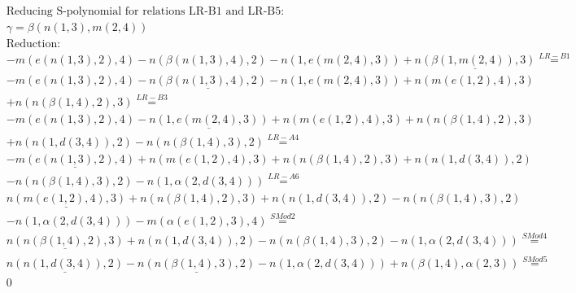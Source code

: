 \documentclass[11pt]{amsart}
\begin{document}
\begin{align*} 
& \text{Reducing S-polynomial for relations LR-B1 and LR-B5:} \\ 
& \gamma = \beta(n(1,3),m(2,4)) \\ 
& \text{Reduction}: \\& - m(e(n(1,3),2),4) - n(\beta(n(1,3),4),2) - n(1,e(m(2,4),3)) + \underline{n(\beta(1,m(2,4)),3)} \stackrel{ LR-B1 }{=}  \\ 
& - m(e(n(1,3),2),4) - \underline{n(\beta(n(1,3),4),2)} - n(1,e(m(2,4),3)) + n(m(e(1,2),4),3)\\ 
 &  + n(n(\beta(1,4),2),3) \stackrel{ LR-B3 }{=}  \\ 
& - m(e(n(1,3),2),4) - \underline{n(1,e(m(2,4),3))} + n(m(e(1,2),4),3) + n(n(\beta(1,4),2),3)\\ 
 &  + n(n(1,d(3,4)),2) - n(n(\beta(1,4),3),2) \stackrel{ LR-A4 }{=}  \\ 
& - \underline{m(e(n(1,3),2),4)} + n(m(e(1,2),4),3) + n(n(\beta(1,4),2),3) + n(n(1,d(3,4)),2)\\ 
 &  - n(n(\beta(1,4),3),2) - n(1,\alpha(2,d(3,4))) \stackrel{ LR-A6 }{=}  \\ 
&\underline{n(m(e(1,2),4),3)} + n(n(\beta(1,4),2),3) + n(n(1,d(3,4)),2) - n(n(\beta(1,4),3),2)\\ 
 &  - n(1,\alpha(2,d(3,4))) - m(\alpha(e(1,2),3),4) \stackrel{ SMod2 }{=}  \\ 
&\underline{n(n(\beta(1,4),2),3)} + n(n(1,d(3,4)),2) - n(n(\beta(1,4),3),2) - n(1,\alpha(2,d(3,4))) \stackrel{ SMod4 }{=}  \\ 
&\underline{n(n(1,d(3,4)),2)} - \underline{n(n(\beta(1,4),3),2)} - n(1,\alpha(2,d(3,4))) + n(\beta(1,4),\alpha(2,3)) \stackrel{ SMod5 }{=}  \\ 
&0\\ 
\end{align*} 
 
\end{document}
